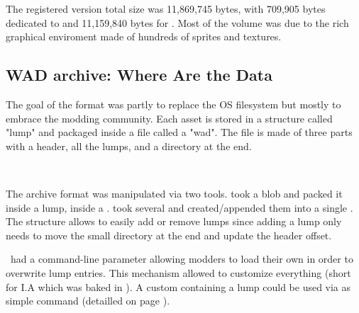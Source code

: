 %   
\vspace{2mm}
\pagebreak
The registered version total size was 11,869,745 bytes, with 709,905 bytes dedicated to  and 11,159,840 bytes for . Most of the volume was due to the rich graphical enviroment made of hundreds of sprites and textures.\\
\par


\par
{}
%  




\subsection{WAD archive: Where Are the Data}
\label{wad_explained}
The goal of the  format was partly to replace the OS filesystem but mostly to embrace the modding community. Each asset is stored in a structure called "lump" and packaged inside a file called a "wad". The file is made of three parts with a header, all the lumps, and a directory at the end.\\

\par
{}
\par
{}\\
\par
{}
\par
The archive format was manipulated via two tools.  took a blob and packed it inside a lump, inside a .  took several  and created/appended them into a single . The structure allows to easily add or remove lumps since adding a lump only needs to move the small directory at the end and update the header offset.\\
\par
\doom~had a command-line parameter allowing modders to load their own  in order to overwrite  lump entries. This mechanism allowed to customize everything (short for I.A which was baked in ). A custom  containing a  lump could be used via as simple  command (detailled on page \pageref{wad_detailled}).




